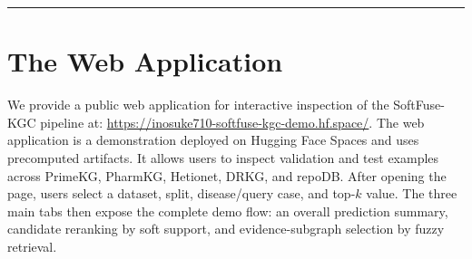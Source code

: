 \documentclass[11pt]{article}
\newcommand{\softfuse}{SoftFuse-KGC}
\begin{document}
    \begin{center}
    {\Large\bfseries {}\par}
    \vspace{0.8em}
    \end{center}

%
%

    \medskip
    \hrule
    \bigskip

    \section*{The Web Application}

    We provide a public web application for interactive inspection of the \softfuse{} pipeline at:
    \url{https://inosuke710-softfuse-kgc-demo.hf.space/}. The web application is a demonstration deployed on Hugging Face Spaces and uses precomputed artifacts. It allows users to inspect validation and test examples across PrimeKG, PharmKG, Hetionet, DRKG, and repoDB. After opening the page, users select a dataset, split, disease/query case, and top-\(k\) value. The three main tabs then expose the complete demo flow: an overall prediction summary, candidate reranking by soft support, and evidence-subgraph selection by fuzzy retrieval.
\end{document}
